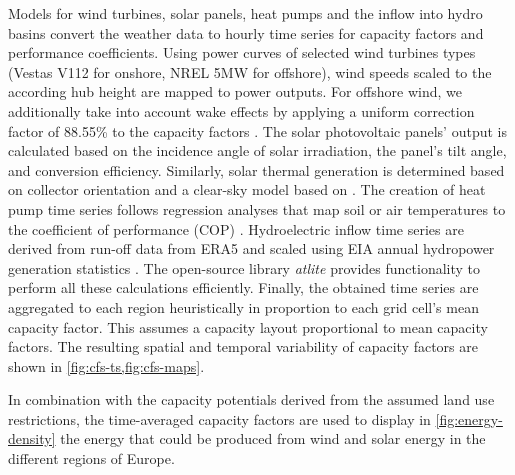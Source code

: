 Models for wind turbines, solar panels, heat pumps and the inflow into hydro
basins convert the weather data to hourly time series for capacity factors and
performance coefficients. Using power curves of selected wind turbines types
(Vestas V112 for onshore, NREL 5MW for offshore), wind speeds scaled to the
according hub height are mapped to power outputs. For offshore wind, we
additionally take into account wake effects by applying a uniform correction
factor of 88.55\% to the capacity factors .
The solar photovoltaic panels' output is calculated based on the incidence angle
of solar irradiation, the panel's tilt angle, and conversion efficiency.
Similarly, solar thermal generation is determined based on collector orientation
and a clear-sky model based on . The
creation of heat pump time series follows regression analyses that map soil or
air temperatures to the coefficient of performance (COP)
. Hydroelectric
inflow time series are derived from run-off data from ERA5 and scaled using EIA
annual hydropower generation statistics
. The
open-source library \textit{atlite} 
provides functionality to perform all these calculations efficiently. Finally,
the obtained time series are aggregated to each region heuristically in
proportion to each grid cell's mean capacity factor. This assumes a capacity
layout proportional to mean capacity factors. The resulting spatial and temporal
variability of capacity factors are shown in
\cref{fig:cfs-ts,fig:cfs-maps}.

In combination with the capacity potentials derived from the assumed land use
restrictions, the time-averaged capacity factors are used to display in
\cref{fig:energy-density} the energy that could be produced from wind and solar
energy in the different regions of Europe.
